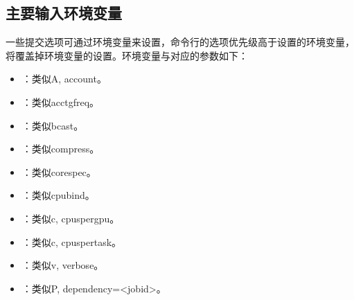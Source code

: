 \documentclass[a4paper,12pt,english]{sphinxmanual}
\begin{document}
\subsection{主要输入环境变量}
\label{\detokenize{slurm/slurm:id21}}
\sphinxAtStartPar
一些提交选项可通过环境变量来设置，命令行的选项优先级高于设置的环境变量，将覆盖掉环境变量的设置。环境变量与对应的参数如下：
\begin{itemize}
\item {} 
\sphinxAtStartPar
{}：类似\sphinxhyphen{}A, \sphinxhyphen{}\sphinxhyphen{}account。

\item {} 
\sphinxAtStartPar
{}：类似\sphinxhyphen{}\sphinxhyphen{}acctg\sphinxhyphen{}freq。

\item {} 
\sphinxAtStartPar
{}：类似\sphinxhyphen{}\sphinxhyphen{}bcast。

\item {} 
\sphinxAtStartPar
{}：类似\sphinxhyphen{}\sphinxhyphen{}compress。

\item {} 
\sphinxAtStartPar
{}：类似\sphinxhyphen{}\sphinxhyphen{}core\sphinxhyphen{}spec。

\item {} 
\sphinxAtStartPar
{}：类似\sphinxhyphen{}\sphinxhyphen{}cpu\sphinxhyphen{}bind。

\item {} 
\sphinxAtStartPar
{}：类似\sphinxhyphen{}c, \sphinxhyphen{}\sphinxhyphen{}cpus\sphinxhyphen{}per\sphinxhyphen{}gpu。

\item {} 
\sphinxAtStartPar
{}：类似\sphinxhyphen{}c, \sphinxhyphen{}\sphinxhyphen{}cpus\sphinxhyphen{}per\sphinxhyphen{}task。

\item {} 
\sphinxAtStartPar
{}：类似\sphinxhyphen{}v, \sphinxhyphen{}\sphinxhyphen{}verbose。

\item {} 
\sphinxAtStartPar
{}：类似\sphinxhyphen{}P, \sphinxhyphen{}\sphinxhyphen{}dependency=<jobid>。


\end{itemize}
\end{document}
